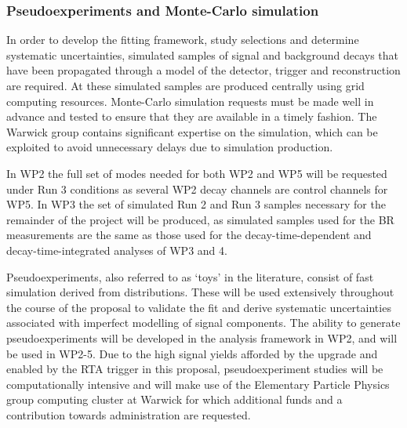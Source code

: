 \documentclass[11pt,a4paper]{article}
\begin{document}
\subsubsection{Pseudoexperiments and Monte-Carlo simulation}
\label{sec:MC}
In order to develop the fitting framework, study selections and determine systematic uncertainties, simulated samples of signal and background decays that have been propagated through a model of the \LHCb detector, trigger and reconstruction are required. At \LHCb these simulated samples are produced centrally using grid computing resources. Monte-Carlo simulation requests must be made well in advance and tested to ensure that they are available in a timely fashion. 
The Warwick group contains significant expertise on the \LHCb simulation, which can be exploited to avoid unnecessary delays due to simulation production.

In WP2 the full set of  modes needed for both WP2 and WP5 will be requested under Run 3 conditions as several WP2 decay channels are control channels for WP5. 
In WP3 the set of simulated Run 2 and Run 3 samples necessary for the remainder of the project will be produced, as simulated samples used for the BR measurements are the same as those used for the decay-time-dependent and decay-time-integrated analyses of WP3 and 4.

Pseudoexperiments, also referred to as `toys' in the literature, consist of fast simulation derived from distributions. These will be used extensively throughout the course of the proposal to validate the fit and derive systematic uncertainties associated with imperfect modelling of signal components. The ability to generate pseudoexperiments will be developed in the analysis framework in WP2, and will be used in WP2-5. Due to the high signal yields afforded by the \LHCb upgrade and enabled by the RTA trigger in this proposal, pseudoexperiment studies will be computationally intensive and will make use of the Elementary Particle Physics group computing cluster at Warwick for which additional funds and a contribution towards administration are requested.
\end{document}
